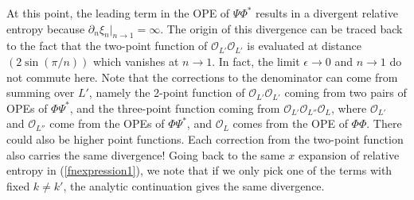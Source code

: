 \documentclass[11pt]{article}
\newcommand{\ep}{\epsilon}
\newcommand{\p}{\partial}
\newcommand{\mO}{\mathcal{O}}
\begin{document}
At this point, the leading term in the OPE of $\Psi\Phi^*$ results in a divergent relative entropy because $\p_n\xi_n|_{n\to 1}=\infty$. The origin of this divergence can be traced back to the fact that the two-point function of $\mO_{L'}\mO_{L'}$ is evaluated at distance $(2\sin(\pi/n))$ which vanishes at $n\to 1$. In fact, the limit $\ep\to 0$ and $n\to 1$ do not commute here. Note that the corrections to the denominator can come from summing over $L'$, namely the 2-point function of $\mO_{L'}\mO_{L'}$ coming from two pairs of OPEs of $\Phi\Psi^*$, and the three-point function coming from $\mO_{L'}\mO_{L''}\mO_L$, where $\mO_{L'}$ and $\mO_{L''}$ come from the OPEs of $\Phi\Psi^*$, and $\mO_L$ comes from the OPE of $\Phi\Phi$. There could also be higher point functions. Each correction from the two-point function also carries the same divergence! Going back to the same $x$ expansion of relative entropy in (\ref{fnexpression1}), we note that if we only pick one of the terms with fixed $k\neq k'$, the analytic continuation gives the same divergence.
\end{document}
